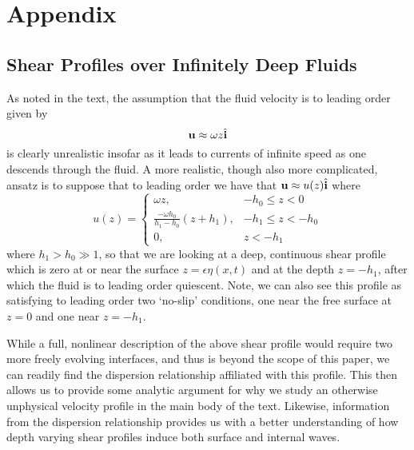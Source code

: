 \documentclass[a4paper,11pt]{article}
\newcommand{\ba}{\begin{array}}
\newcommand{\ea}{\end{array}}
\begin{document}
\section*{Appendix}
\subsection*{Shear Profiles over Infinitely Deep Fluids}
As noted in the text, the assumption that the fluid velocity is to leading order given by 
\[
{\bf u} \approx \omega z \hat{{\bf i}}
\]
is clearly unrealistic insofar as it leads to currents of infinite speed as one descends through the fluid.  A more realistic, though also more complicated, ansatz is to suppose that to leading order we have that ${\bf u}\approx u(z)\hat{{\bf i}}$ where  
\[
u(z) = \left\{\ba{rl} \omega z, & -h_{0} \leq z < 0 \\
\frac{-\omega h_{0}}{h_{1}-h_{0}} (z+h_{1}), & -h_{1} \leq z < -h_{0} \\
0, & z < -h_{1}
\ea \right.
\] 
where $h_{1}>h_{0}\gg 1$, so that we are looking at a deep, continuous shear profile which is zero at or near the surface $z=\epsilon \eta(x,t)$ and at the depth $z=-h_{1}$, after which the fluid is to leading order quiescent.  Note, we can also see this profile as satisfying to leading order two `no-slip' conditions, one near the free surface at $z=0$ and one near $z=-h_{1}$.

While a full, nonlinear description of the above shear profile would require two more freely evolving interfaces, and thus is beyond the scope of this paper, we can readily find the dispersion relationship affiliated with this profile.  This then allows us to provide some analytic argument for why we study an otherwise unphysical velocity profile in the main body of the text.  Likewise, information from the dispersion relationship provides us with a better understanding of how depth varying shear profiles induce both surface and internal waves.
\end{document}
